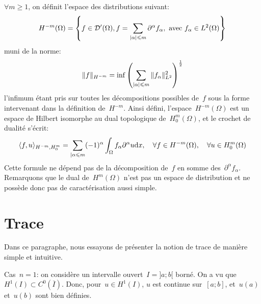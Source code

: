 $\forall m\ge 1$, on définit l'espace des distributions suivant:
\begin{equation}
H^{-m}(\Omega) =\left\{
f\in \mathcal{D}'(\Omega), f=\displaystyle\sum_{|\alpha|\leqslant m} \partial^\alpha f_\alpha,
\text{ avec } f_\alpha\in L^2(\Omega)
\right\}
\end{equation}
muni de la norme:
\begin{equation}
\|f\|_{H^{-m}} = \inf \left( \displaystyle\sum_{|\alpha|\leqslant m} \|f_\alpha\|^2_{L^2} \right)^{1\over2}
\end{equation}
l'infimum étant pris sur toutes les décompositions possibles de~$f$ sous la forme intervenant
dans la définition de~$H^{-m}$.
\medskipvm
Ainsi défini, l'espace~$H^{-m}(\Omega)$ est un espace de Hilbert isomorphe au dual
topologique de~$H^m_0(\Omega)$, et le crochet de dualité s'écrit:
\begin{equation}
\langle f,u\rangle_{H^{-m},H_0^m} = \displaystyle\sum_{|\alpha\leqslant m} (-1)^\alpha \displaystyle\int_\Omega
f_\alpha \partial^\alpha u \text{d} x,
\quad \forall f\in H^{-m}(\Omega),\quad \forall u\in H^m_0(\Omega)
\end{equation}
Cette formule ne dépend pas de la décomposition de~$f$ en somme des~$\partial^\alpha f_\alpha$.
\medskipvm
Remarquons que le dual de~$H^m(\Omega)$ n'est pas un espace de distribution et ne possède
donc pas de caractérisation aussi simple.

\medskip
\section{Trace}
Dans ce paragraphe, nous essayons de présenter la notion de trace de manière simple et intuitive.

\medskip
{}

\medskip
Cas~$n=1$:
on considère un intervalle ouvert~$I =]a;b[$ borné. On a vu que~$H^1(I)\subset C^0(\overline{I})$.
Donc, pour~$u\in H^1(I)$, $u$ est continue sur~$[a;b]$, et~$u(a)$ et~$u(b)$ sont bien définies.

